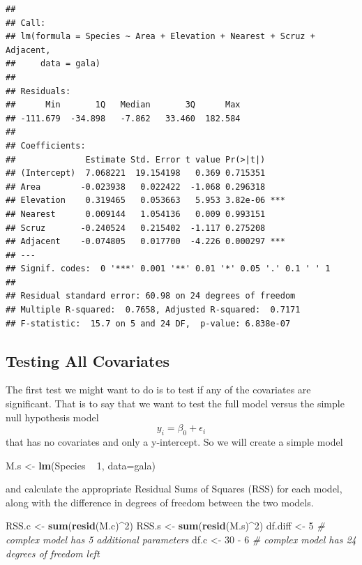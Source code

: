 \documentclass[]{book}
\newenvironment{Shaded}{\begin{snugshade}}{\end{snugshade}}
\newcommand{\KeywordTok}[1]{\textcolor[rgb]{0.13,0.29,0.53}{\textbf{{#1}}}}
\newcommand{\DataTypeTok}[1]{\textcolor[rgb]{0.13,0.29,0.53}{{#1}}}
\newcommand{\DecValTok}[1]{\textcolor[rgb]{0.00,0.00,0.81}{{#1}}}
\newcommand{\StringTok}[1]{\textcolor[rgb]{0.31,0.60,0.02}{{#1}}}
\newcommand{\CommentTok}[1]{\textcolor[rgb]{0.56,0.35,0.01}{\textit{{#1}}}}
\newcommand{\NormalTok}[1]{{#1}}
\theoremstyle{definition}
\theoremstyle{definition}
\theoremstyle{remark}
\begin{document}
\begin{verbatim}
## 
## Call:
## lm(formula = Species ~ Area + Elevation + Nearest + Scruz + Adjacent, 
##     data = gala)
## 
## Residuals:
##      Min       1Q   Median       3Q      Max 
## -111.679  -34.898   -7.862   33.460  182.584 
## 
## Coefficients:
##              Estimate Std. Error t value Pr(>|t|)    
## (Intercept)  7.068221  19.154198   0.369 0.715351    
## Area        -0.023938   0.022422  -1.068 0.296318    
## Elevation    0.319465   0.053663   5.953 3.82e-06 ***
## Nearest      0.009144   1.054136   0.009 0.993151    
## Scruz       -0.240524   0.215402  -1.117 0.275208    
## Adjacent    -0.074805   0.017700  -4.226 0.000297 ***
## ---
## Signif. codes:  0 '***' 0.001 '**' 0.01 '*' 0.05 '.' 0.1 ' ' 1
## 
## Residual standard error: 60.98 on 24 degrees of freedom
## Multiple R-squared:  0.7658, Adjusted R-squared:  0.7171 
## F-statistic:  15.7 on 5 and 24 DF,  p-value: 6.838e-07
\end{verbatim}

\subsection{Testing All Covariates}\label{testing-all-covariates}

The first test we might want to do is to test if any of the covariates
are significant. That is to say that we want to test the full model
versus the simple null hypothesis model \[y_{i}=\beta_{0}+\epsilon_{i}\]
that has no covariates and only a y-intercept. So we will create a
simple model

\begin{Shaded}
\begin{Highlighting}[]
\NormalTok{M.s <-}\StringTok{ }\KeywordTok{lm}\NormalTok{(Species ~}\StringTok{ }\DecValTok{1}\NormalTok{, }\DataTypeTok{data=}\NormalTok{gala)}
\end{Highlighting}
\end{Shaded}

and calculate the appropriate Residual Sums of Squares (RSS) for each
model, along with the difference in degrees of freedom between the two
models.

\begin{Shaded}
\begin{Highlighting}[]
\NormalTok{RSS.c <-}\StringTok{ }\KeywordTok{sum}\NormalTok{(}\KeywordTok{resid}\NormalTok{(M.c)^}\DecValTok{2}\NormalTok{)}
\NormalTok{RSS.s <-}\StringTok{ }\KeywordTok{sum}\NormalTok{(}\KeywordTok{resid}\NormalTok{(M.s)^}\DecValTok{2}\NormalTok{)}
\NormalTok{df.diff <-}\StringTok{ }\DecValTok{5}               \CommentTok{# complex model has 5 additional parameters}
\NormalTok{df.c <-}\StringTok{ }\DecValTok{30} \NormalTok{-}\StringTok{ }\DecValTok{6}             \CommentTok{# complex model has 24 degrees of freedom left}
\end{Highlighting}
\end{Shaded}
\end{document}
